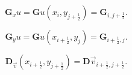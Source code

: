 \begin{equation*}
	\symbf{G}_{x}u=
	\symbf{G}u\left(x_{i},y_{j+\frac{1}{2}}\right)=
	\symbf{G}_{i,j+\frac{1}{2}}.
\end{equation*}

\begin{equation*}
	\symbf{G}_{y}u=
	\symbf{G}u\left(x_{i+\frac{1}{2}},y_{j}\right)=
	\symbf{G}_{i+\frac{1}{2},j}.
\end{equation*}

\begin{equation*}
	\symbf{D}_{\vec{v}}\left(x_{i+\frac{1}{2}},y_{j+\frac{1}{2}}\right)=
	\symbf{D}\vec{v}_{i+\frac{1}{2},j+\frac{1}{2}}.
\end{equation*}
